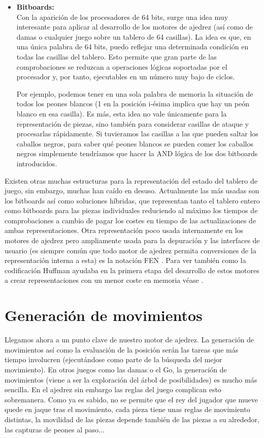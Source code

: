 \documentclass[letterpaper,12pt]{article}
\begin{document}
\begin{itemize}
    \item \textbf{Bitboards:} \\
    Con la aparición de los procesadores de 64 bits, surge una idea muy interesante para
    aplicar al desarrollo de los motores de ajedrez (así como de damas o cualquier juego 
    sobre un tablero de 64 casillas). La idea es que, en una única palabra de 64 bits, 
    puedo reflejar una determinada condición en todas las casillas del tablero. Esto 
    permite que gran parte de las comprobaciones se reduzcan a operaciones lógicas 
    soportadas por el procesador y, por tanto, ejecutables en un número muy bajo de ciclos.
    
    Por ejemplo, podemos tener en una sola palabra de memoria la situación de todos los
    peones blancos (1 en la posición i-ésima implica que hay un peón blanco en esa 
    casilla). Es más, esta idea no vale únicamente para la representación de piezas, sino
    también para considerar casillas de ataque y procesarlas rápidamente. Si tuvieramos
    las casillas a las que pueden saltar los caballos negros, para saber qué peones blancos
    se pueden comer los caballos negros simplemente tendríamos que hacer la AND lógica
    de los dos bitboards introducidos.
    
\end{itemize}
    
Existen otras muchas estructuras para la representación del estado del tablero de juego,
sin embargo, muchas han caído en desuso. Actualmente las más usadas son los bitboards así
como soluciones híbridas, que representan tanto el tablero entero como bitboards para las
piezas individuales reduciendo al máximo los tiempos de comprobaciones a cambio de pagar
los costes en tiempo de las actualizaciones de ambas representaciones. Otra representación
poco usada internamente en los motores de ajedrez pero ampliamente usada para la 
depuración y las interfaces de usuario (es siempre común que todo motor de ajedrez permita
conversiones de la representación interna a esta) es la notación FEN \cite{Intro6}. Para
ver también como la codificación Huffman ayudaba en la primera etapa del desarrollo de 
estos motores a crear representaciones con un menor coste en memoria véase 
\cite{BoardRepresentation3}.
    

\section{Generación de movimientos}

Llegamos ahora a un punto clave de nuestro motor de ajedrez. La generación de movimientos
así como la evaluación de la posición serán las tareas que más tiempo involucren 
(ejecutándose como parte de la búsqueda del mejor movimiento). En otros juegos como las
damas o el Go, la generación de movimientos (viene a ser la exploración del árbol de 
posibilidades) es mucho más sencilla. En el ajedrez sin embargo las reglas del juego
complican esto sobremanera. Como ya es sabido, no se permite que el rey del jugador que
mueve quede en jaque tras el movimiento, cada pieza tiene unas reglas de movimiento 
distintas, la movilidad de las piezas depende también de las piezas a su alrededor, las
capturas de peones al paso... 
\end{document}
